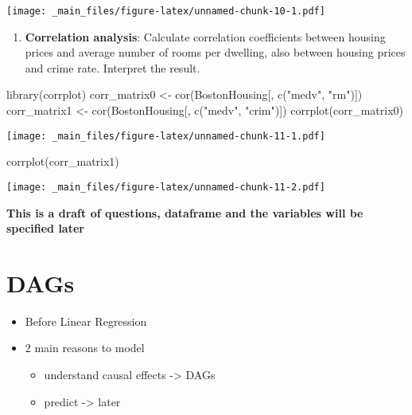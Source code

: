 \documentclass[
]{book}
\newenvironment{Shaded}{\begin{snugshade}}{\end{snugshade}}
\newcommand{\FunctionTok}[1]{\textcolor[rgb]{0.00,0.00,0.00}{#1}}
\newcommand{\NormalTok}[1]{#1}
\newcommand{\OtherTok}[1]{\textcolor[rgb]{0.56,0.35,0.01}{#1}}
\newcommand{\StringTok}[1]{\textcolor[rgb]{0.31,0.60,0.02}{#1}}
\providecommand{\tightlist}{%
  \setlength{\itemsep}{0pt}\setlength{\parskip}{0pt}}
\begin{document}
\texttt{[image: \_main\_files/figure-latex/unnamed-chunk-10-1.pdf]}

\begin{enumerate}
\def\labelenumi{\arabic{enumi}.}
\setcounter{enumi}{7}
\tightlist
\item
  \textbf{Correlation analysis}: Calculate correlation coefficients between housing prices and average number of rooms per dwelling, also between housing prices and crime rate. Interpret the result.
\end{enumerate}

\begin{Shaded}
\begin{Highlighting}[]
\FunctionTok{library}\NormalTok{(corrplot)}
\NormalTok{corr\_matrix0 }\OtherTok{\textless{}{-}} \FunctionTok{cor}\NormalTok{(BostonHousing[, }\FunctionTok{c}\NormalTok{(}\StringTok{"medv"}\NormalTok{, }\StringTok{"rm"}\NormalTok{)])}
\NormalTok{corr\_matrix1 }\OtherTok{\textless{}{-}} \FunctionTok{cor}\NormalTok{(BostonHousing[, }\FunctionTok{c}\NormalTok{(}\StringTok{"medv"}\NormalTok{, }\StringTok{"crim"}\NormalTok{)])}
\FunctionTok{corrplot}\NormalTok{(corr\_matrix0)}
\end{Highlighting}
\end{Shaded}

\texttt{[image: \_main\_files/figure-latex/unnamed-chunk-11-1.pdf]}

\begin{Shaded}
\begin{Highlighting}[]
\FunctionTok{corrplot}\NormalTok{(corr\_matrix1)}
\end{Highlighting}
\end{Shaded}

\texttt{[image: \_main\_files/figure-latex/unnamed-chunk-11-2.pdf]}

\textbf{This is a draft of questions, dataframe and the variables will be specified later}

\hypertarget{dags-1}{%
\chapter{DAGs}\label{dags-1}}

\begin{itemize}
\tightlist
\item
  Before Linear Regression
\item
  2 main reasons to model

  \begin{itemize}
  \tightlist
  \item
    understand causal effects -\textgreater{} DAGs
  \item
    predict -\textgreater{} later
  \end{itemize}
\end{itemize}
\end{document}
